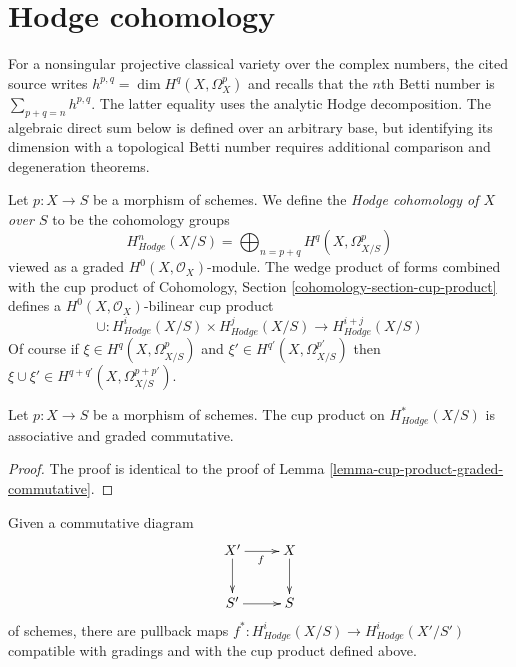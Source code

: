 \section{Hodge cohomology}
\label{section-hodge-cohomology}
\begin{reference}
\cite[Chapter II, \S 2, no. 41, p. 233]{FAC}
\end{reference}
\begin{history}
For a nonsingular projective classical variety over the complex numbers, the
cited source writes $h^{p, q} = \dim H^q(X, \Omega^p_X)$ and recalls that
the $n$th Betti number is $\sum_{p + q = n} h^{p, q}$. The latter equality
uses the analytic Hodge decomposition. The algebraic direct sum below is
defined over an arbitrary base, but identifying its dimension with a
topological Betti number requires additional comparison and degeneration
theorems.
\end{history}

\noindent
Let $p : X \to S$ be a morphism of schemes. We define the
{\it Hodge cohomology of $X$ over $S$} to be the cohomology groups
$$
H^n_{Hodge}(X/S) = \bigoplus\nolimits_{n = p + q} H^q(X, \Omega^p_{X/S})
$$
viewed as a graded $H^0(X, \mathcal{O}_X)$-module. The wedge product
of forms combined with the cup product of
Cohomology, Section \ref{cohomology-section-cup-product}
defines a $H^0(X, \mathcal{O}_X)$-bilinear cup product
$$
\cup :
H^i_{Hodge}(X/S) \times H^j_{Hodge}(X/S)
\longrightarrow
H^{i + j}_{Hodge}(X/S)
$$
Of course if $\xi \in H^q(X, \Omega^p_{X/S})$ and
$\xi' \in H^{q'}(X, \Omega^{p'}_{X/S})$ then $\xi \cup \xi' \in
H^{q + q'}(X, \Omega^{p + p'}_{X/S})$.

\begin{lemma}
\label{lemma-cup-product-hodge-graded-commutative}
Let $p : X \to S$ be a morphism of schemes.
The cup product on $H^*_{Hodge}(X/S)$ is associative and graded commutative.
\end{lemma}

\begin{proof}
The proof is identical to the proof of
Lemma \ref{lemma-cup-product-graded-commutative}.
\end{proof}

\noindent
Given a commutative diagram
$$
\xymatrix{
X' \ar[r]_f \ar[d] & X \ar[d] \\
S' \ar[r] & S
}
$$
of schemes, there are pullback maps
$f^* : H^i_{Hodge}(X/S) \longrightarrow H^i_{Hodge}(X'/S')$
compatible with gradings and with the cup product defined above.







